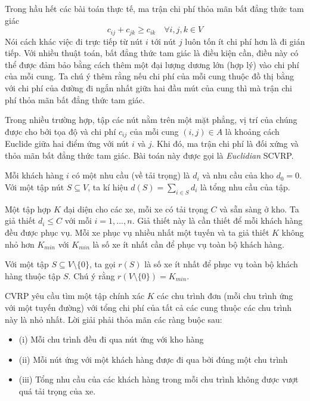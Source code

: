 Trong hầu hết các bài toán thực tế, ma trận chi phí thỏa mãn bất đẳng thức tam giác
\begin{equation}
	c_{ij} + c_{jk} \geq c_{ik} \quad \forall i,j,k \in V
\end{equation}
Nói cách khác việc đi trực tiếp từ nút $i$ tới nút $j$ luôn tốn ít chi phí hơn là đi gián tiếp. Với nhiều thuật toán, bất đẳng thức tam giác là điều kiện cần, điều này có thể được đảm bảo bằng cách thêm một đại lượng dương lớn (hợp lý) vào chi phí của mỗi cung. Ta chú ý thêm rằng nếu chi phí của mỗi cung thuộc đồ thị bằng với chi phí của đường đi ngắn nhất giữa hai đầu mút của cung thì mà trận chi phí thỏa mãn bất đẳng thức tam giác.

Trong nhiều trường hợp, tập các nút nằm trên một mặt phẳng, vị trí của chúng được cho bởi tọa độ và chi phí $c_{ij}$ của mỗi cung $(i,j) \in A$ là khoảng cách Euclide giữa hai điểm ứng với nút $i$ và $j$. Khi đó, ma trận chi phí là đối xứng và thỏa mãn bất đẳng thức tam giác. Bài toán này được gọi là \textit{Euclidian} SCVRP.

Mỗi khách hàng $i$ có một nhu cầu (về tải trọng) là $d_i$ và nhu cầu của kho $d_0=0$. Với một tập nút $S \subseteq V$, ta kí hiệu $d(S) = \sum_{i \in S} d_i$ là tổng nhu cầu của tập.

Một tập hợp $K$ đại diện cho các xe, mỗi xe có tải trọng $C$ và sẵn sàng ở kho. Ta giả thiết $d_i \leq C$ với mỗi $i=1,...,n$. Giả thiết này là cần thiết để  mỗi khách hàng đều được phục vụ. Mỗi xe phục vụ nhiều nhất một tuyến và ta giả thiết $K$ không nhỏ hơn $K_{min}$ với $K_{min}$ là số xe ít nhất cần để phục vụ toàn bộ khách hàng.

Với một tập $S \subseteq V \setminus \{0\}$, ta gọi $r(S)$ là số xe ít nhất để phục vụ toàn bộ khách hàng thuộc tập $S$. Chú ý rằng $r(V \setminus \{0\}) = K_{min}$.

CVRP yêu cầu tìm một tập chính xác $K$ các chu trình đơn (mỗi chu trình ứng với một tuyến đường) với tổng chi phí của tất cả các cung thuộc các chu trình này là nhỏ nhất. Lời giải phải thỏa mãn các ràng buộc sau:
\begin{itemize}
	\item[] (i) Mỗi chu trình đều đi qua nút ứng với kho hàng
	\item[] (ii) Mỗi nút ứng với một khách hàng được đi qua bởi đúng một chu trình
	\item[] (iii) Tổng nhu cầu của các khách hàng trong mỗi chu trình không được vượt quá tải trọng của xe.
\end{itemize}

